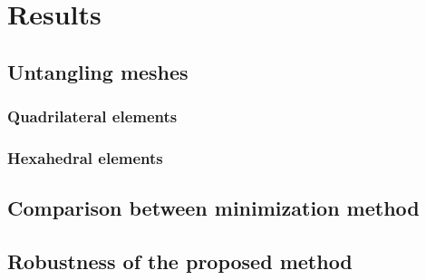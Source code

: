 
\chapter{Results}
\label{chp:04-results}
\thispagestyle{empty}

\section{Untangling meshes}
\label{sec:performance}

\subsection{Quadrilateral elements}

\subsection{Hexahedral elements}
\label{ssub:hexahedral-element-smoothing}

\section{Comparison between minimization method}
\label{sec:comparison-minimization-methods}

\section{Robustness of the proposed method}
\label{sec:robustness}

